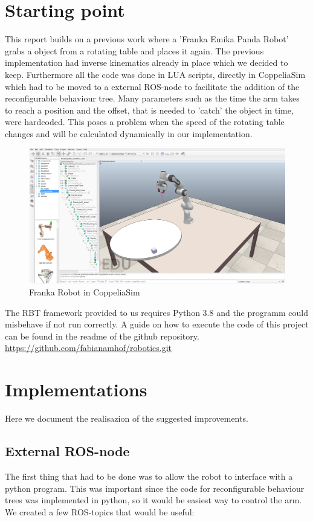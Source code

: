 \documentclass[report]{iisthesis}
\begin{document}
\setcounter{chapter}{1}
\setcounter{section}{0}
\chapter{Starting point}
This report builds on a previous work where a 'Franka Emika Panda Robot' grabs a object from a rotating table and places it again.
The previous implementation had inverse kinematics already in place which we decided to keep. Furthermore all the code was done in LUA scripts, directly in CoppeliaSim which had to be moved to a external ROS-node to facilitate the addition of the reconfigurable behaviour tree.
Many parameters such as the time the arm takes to reach a position and the offset, that is needed to 'catch' the object in time, were hardcoded. This poses a problem when the speed of the rotating table changes and will be calculated dynamically in our implementation.\\

\begin{figure}[h]
    \caption{Franka Robot in CoppeliaSim}
    \includegraphics[width=\textwidth]{arm_coppeliaSim}
\end{figure}
\noindent
The RBT framework provided to us requires Python 3.8 and the programm could misbehave if not run correctly.
A guide on how to execute the code of this project can be found in the readme of the github repository. \\ 
\url{https://github.com/fabianamhof/robotics.git}

\setcounter{chapter}{2}
\setcounter{section}{0}
\chapter{Implementations}
Here we document the realisazion of the suggested improvements.

\section{External ROS-node}
The first thing that had to be done was to allow the robot to interface with a python program.
This was important since the code for reconfigurable behaviour trees was implemented in python, so it would be easiest way to control the 
arm.
We created a few ROS-topics that would be useful:
\end{document}
